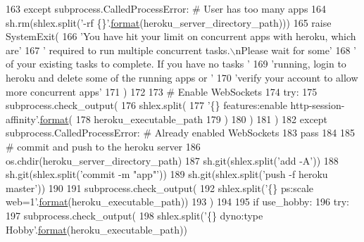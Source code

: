 \begin{DoxyCode}
163     \textcolor{keywordflow}{except} subprocess.CalledProcessError:  \textcolor{comment}{# User has too many apps}
164         sh.rm(shlex.split(\textcolor{stringliteral}{'-rf \{\}'}.\hyperlink{namespaceparlai_1_1chat__service_1_1services_1_1messenger_1_1shared__utils_a32e2e2022b824fbaf80c747160b52a76}{format}(heroku\_server\_directory\_path)))
165         \textcolor{keywordflow}{raise} SystemExit(
166             \textcolor{stringliteral}{'You have hit your limit on concurrent apps with heroku, which are'}
167             \textcolor{stringliteral}{' required to run multiple concurrent tasks.\(\backslash\)nPlease wait for some'}
168             \textcolor{stringliteral}{' of your existing tasks to complete. If you have no tasks '}
169             \textcolor{stringliteral}{'running, login to heroku and delete some of the running apps or '}
170             \textcolor{stringliteral}{'verify your account to allow more concurrent apps'}
171         )
172 
173     \textcolor{comment}{# Enable WebSockets}
174     \textcolor{keywordflow}{try}:
175         subprocess.check\_output(
176             shlex.split(
177                 \textcolor{stringliteral}{'\{\} features:enable http-session-affinity'}.\hyperlink{namespaceparlai_1_1chat__service_1_1services_1_1messenger_1_1shared__utils_a32e2e2022b824fbaf80c747160b52a76}{format}(
178                     heroku\_executable\_path
179                 )
180             )
181         )
182     \textcolor{keywordflow}{except} subprocess.CalledProcessError:  \textcolor{comment}{# Already enabled WebSockets}
183         \textcolor{keywordflow}{pass}
184 
185     \textcolor{comment}{# commit and push to the heroku server}
186     os.chdir(heroku\_server\_directory\_path)
187     sh.git(shlex.split(\textcolor{stringliteral}{'add -A'}))
188     sh.git(shlex.split(\textcolor{stringliteral}{'commit -m "app"'}))
189     sh.git(shlex.split(\textcolor{stringliteral}{'push -f heroku master'}))
190 
191     subprocess.check\_output(
192         shlex.split(\textcolor{stringliteral}{'\{\} ps:scale web=1'}.\hyperlink{namespaceparlai_1_1chat__service_1_1services_1_1messenger_1_1shared__utils_a32e2e2022b824fbaf80c747160b52a76}{format}(heroku\_executable\_path))
193     )
194 
195     \textcolor{keywordflow}{if} use\_hobby:
196         \textcolor{keywordflow}{try}:
197             subprocess.check\_output(
198                 shlex.split(\textcolor{stringliteral}{'\{\} dyno:type Hobby'}.\hyperlink{namespaceparlai_1_1chat__service_1_1services_1_1messenger_1_1shared__utils_a32e2e2022b824fbaf80c747160b52a76}{format}(heroku\_executable\_path))

\end{DoxyCode}
